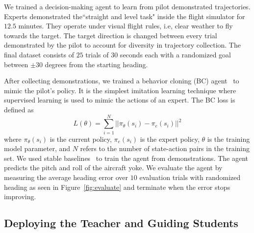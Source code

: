 \documentclass[letterpaper]{article} %
\begin{document}
We trained a decision-making agent to learn from pilot demonstrated trajectories. Experts demonstrated the``straight and level task" inside the flight simulator for $12.5$ minutes. They operate under visual flight rules, i.e, clear weather to fly towards the target. The target direction is changed between every trial demonstrated by the pilot to account for diversity in trajectory collection. The final dataset consists of $25$ trials of $30$ seconds each with a randomized goal between $\pm 30$ degrees from the starting heading.

After collecting demonstrations, we trained a behavior cloning (BC) agent~\cite{pomerleau1988alvinn} to mimic the pilot's policy. It is the simplest imitation learning technique where supervised learning is used to mimic the actions of an expert. The BC loss is defined as 
\begin{equation}
   L(\theta)=\sum_{i=1}^{N}||\pi_{\theta}(s_i)-\pi_e(s_i)||^2
   \label{bc_loss}
\end{equation}
where $\pi_{\theta}(s_i)$ is the current policy, $\pi_e(s_i)$ is the expert policy, $\theta$ is the training model parameter, and $N$ refers to the number of state-action pairs in the training set. We used stable baselines~\cite{stable-baselines3} to train the agent from demonstrations. The agent predicts the pitch and roll of the aircraft yoke. We evaluate the agent by measuring the average heading error over $10$ evaluation trials with randomized heading as seen in Figure~\ref{fig:evaluate} and terminate when the error stops improving.



\subsection{Deploying the Teacher and Guiding Students}
\end{document}
